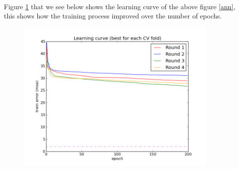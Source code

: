 \\
Figure \ref{ann2} that we see below shows the learning curve of the above figure \ref{ann}, this shows how the training process improved over the number of epochs.
\begin{figure}[!h]
\centering
\includegraphics[width=10cm, keepaspectratio=true]{pictures/ann_21_4_230.png}
\vspace{-0.4cm}
\caption{\footnotesize }
\label{ann2}
\end{figure}